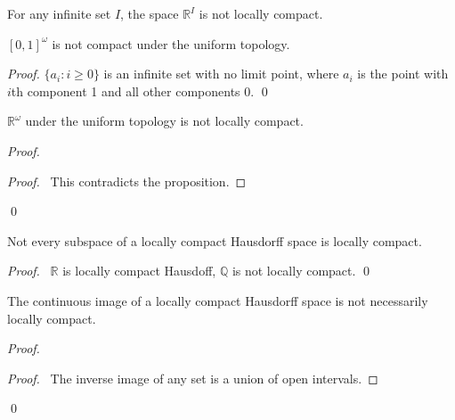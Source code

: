 \begin{cor}
For any infinite set $I$, the space $\mathbb{R}^I$ is not locally compact.
\end{cor}

\begin{prop}
 $[0,1]^\omega$ is not compact under the uniform topology.
\end{prop}

\begin{proof}
 \pf $\{ a_i : i \geq 0 \}$ is an infinite set with no limit point, where
$a_i$ is the point with $i$th component 1 and all other components 0. \qed
\end{proof}

\begin{cor}
 $\mathbb{R}^\omega$ under the uniform topology is not locally compact.
\end{cor}

\begin{proof}
\pf
{}
\qedstep
\begin{proof}
  \pf\ This contradicts the proposition.
\end{proof}
\qed
\end{proof}

\begin{prop}
 Not every subspace of a locally compact Hausdorff space is locally compact.
\end{prop}

\begin{proof}
 \pf\ $\mathbb{R}$ is locally compact Hausdoff, $\mathbb{Q}$ is not locally compact. \qed
\end{proof}

\begin{prop}
 The continuous image of a locally compact Hausdorff space is not necessarily locally compact.
\end{prop}

\begin{proof}
 \pf
 \begin{proof}
   \pf\ The inverse image of any set is a union of open intervals.
 \end{proof}
 \qed
\end{proof}

